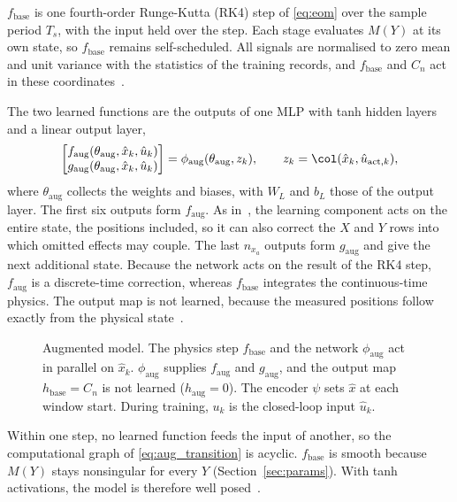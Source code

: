 $f_{\mathrm{base}}$ is one fourth-order Runge-Kutta (RK4) step of
\eqref{eq:eom} over the sample period $T_s$, with the input held over the
step.
Each stage evaluates $M(Y)$ at its own state, so $f_{\mathrm{base}}$ remains
self-scheduled.
All signals are normalised to zero mean and unit variance with the
statistics of the training records, and $f_{\mathrm{base}}$ and $C_n$ act in
these coordinates~\cite[Sec.~5.3]{hoekstra2026lfr}.

The two learned functions are the outputs of one MLP with tanh hidden
layers and a linear output layer,
\begin{equation}
 \begin{bmatrix}
  f_{\mathrm{aug}}(\theta_{\mathrm{aug}},\hat x_k,\hat u_k)\\
  g_{\mathrm{aug}}(\theta_{\mathrm{aug}},\hat x_k,\hat u_k)
 \end{bmatrix}
 =\phi_{\mathrm{aug}}(\theta_{\mathrm{aug}},z_k),\qquad
 z_k=\col(\hat x_k,\hat u_{\mathrm{act},k}),
 \label{eq:aug_mlp}
\end{equation}
where $\theta_{\mathrm{aug}}$ collects the weights and biases, with $W_L$
and $b_L$ those of the output layer.
The first six outputs form $f_{\mathrm{aug}}$.
As in~\cite[Sec.~2]{hoekstra2025lfr}, the learning component acts on the
entire state, the positions included, so it can also correct the $X$ and
$Y$ rows into which omitted effects may couple.
The last $n_{x_a}$ outputs form $g_{\mathrm{aug}}$ and give the next
additional state.
Because the network acts on the result of the RK4 step, $f_{\mathrm{aug}}$
is a discrete-time correction, whereas $f_{\mathrm{base}}$ integrates the
continuous-time physics.
The output map is not learned, because the measured positions follow
exactly from the physical state~\cite[Remark~5.3]{kessels2025ai}.

\begin{figure}[t]
 \centering
 \resizebox{\columnwidth}{!}{}
 \caption{Augmented model. The physics step $f_{\mathrm{base}}$ and the
 network $\phi_{\mathrm{aug}}$ act in parallel on $\hat x_k$.
 $\phi_{\mathrm{aug}}$ supplies $f_{\mathrm{aug}}$ and $g_{\mathrm{aug}}$,
 and the output map $h_{\mathrm{base}}=C_n$ is not learned
 ($h_{\mathrm{aug}}=0$). The encoder $\psi$ sets $\hat x$ at each window
 start. During training, $u_k$ is the closed-loop input $\hat u_k$.}
 \label{fig:aug_structure}
\end{figure}

Within one step, no learned function feeds the input of another, so the
computational graph of \eqref{eq:aug_transition} is acyclic.
$f_{\mathrm{base}}$ is smooth because $M(Y)$ stays nonsingular for every $Y$
(Section~\ref{sec:params}).
With tanh activations, the model is therefore well
posed~\cite[Thm.~9]{hoekstra2026lfr}.

